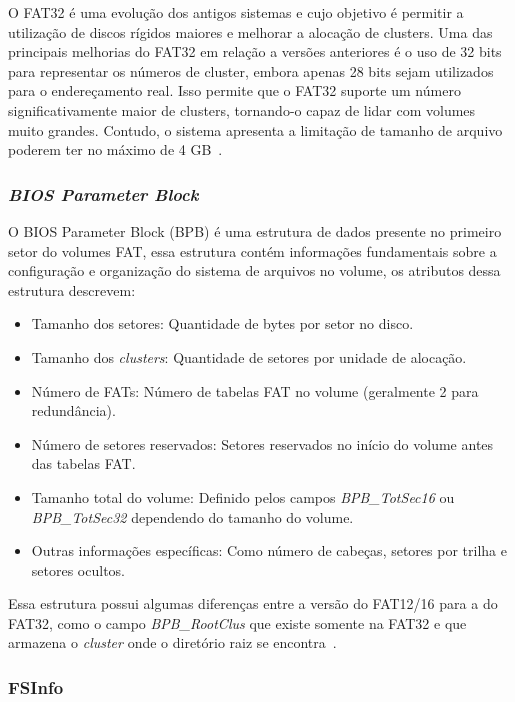 \documentclass[
    12pt,				%
    oneside,   	        %
    a4paper,			%
    english,			%
    french,				%
    spanish,			%
    brazil,				%
    ]{pacotes/abntex2}
\begin{document}
O FAT32 é uma evolução dos antigos sistemas e cujo objetivo é permitir a utilização de discos rígidos maiores e melhorar a alocação de clusters. Uma das principais melhorias do FAT32 em relação a versões anteriores é o uso de 32 bits para representar os números de cluster, embora apenas 28 bits sejam utilizados para o endereçamento real. Isso permite que o FAT32 suporte um número significativamente maior de clusters, tornando-o capaz de lidar com volumes muito grandes. Contudo, o sistema apresenta a limitação de tamanho de arquivo poderem ter no máximo de 4 GB~\cite{osdev}.

\subsubsection{\textit{BIOS Parameter Block}}
\label{subsubsec:bpb}

O BIOS Parameter Block (BPB) é uma estrutura de dados presente no primeiro setor do volumes FAT, essa estrutura contém informações fundamentais sobre a configuração e organização do sistema de arquivos no volume, os atributos dessa estrutura descrevem:

\begin{itemize}
    \item Tamanho dos setores: Quantidade de bytes por setor no disco.
    \item Tamanho dos \textit{clusters}: Quantidade de setores por unidade de alocação.
    \item Número de FATs: Número de tabelas FAT no volume (geralmente 2 para redundância).
    \item Número de setores reservados: Setores reservados no início do volume antes das tabelas FAT.
    \item Tamanho total do volume: Definido pelos campos \textit{BPB\_TotSec16} ou \textit{BPB\_TotSec32} dependendo do tamanho do volume.
    \item Outras informações específicas: Como número de cabeças, setores por trilha e setores ocultos.
\end{itemize}

Essa estrutura possui algumas diferenças entre a versão do FAT12/16 para a do FAT32, como o campo \textit{BPB\_RootClus} que existe somente na FAT32 e que armazena o \textit{cluster} onde o diretório raiz se encontra~\cite{microsoft2000}.

\subsubsection{FSInfo}
\label{subsubsec:fsinfo}
\end{document}
